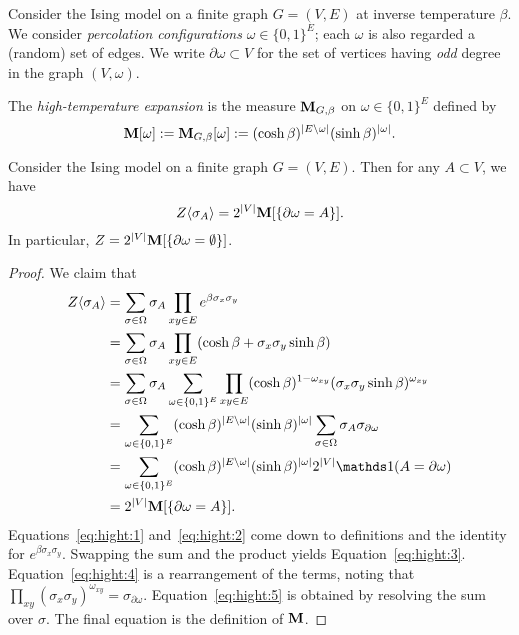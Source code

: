 \begin{definition}
    Consider the Ising model on a finite graph $G=(V,E)$ at inverse temperature $\beta$.
    We consider \emph{percolation configurations} $\omega\in\{0,1\}^E$;
    each $\omega$ is also regarded a (random) set of edges.
    We write $\partial\omega\subset V$ for the set of vertices having
    \emph{odd} degree in the graph $(V,\omega)$.

    The \emph{high-temperature expansion} is the measure $\mathbf{M}_{G,\beta}$
    on $\omega\in\{0,1\}^E$ defined by
    \[
        \mathbf{M}[\omega]:=\mathbf{M}_{G,\beta}[\omega]:=(\cosh\beta)^{|E\setminus\omega|}(\sinh\beta)^{|\omega|}.
    \]
\end{definition}

\begin{theorem}
    \label{thm:High-temperature expansion for correlation functions}
    Consider the Ising model on a finite graph $G=(V,E)$.
    Then for any $A\subset V$, we have
    \[
        Z\langle\sigma_A\rangle=2^{|V|}\mathbf{M}[\{\partial\omega=A\}].
    \]
    In particular, $Z=2^{|V|}\mathbf{M}[\{\partial\omega=\emptyset\}]$.
\end{theorem}

\begin{proof}
    We claim that
    \begin{align}
        \label{eq:hight:1}
        Z\langle\sigma_A\rangle
        &=
        \sum_{\sigma\in\Omega}
        \sigma_A
        \prod_{xy\in E}
        e^{\beta\sigma_x\sigma_y}
        \\
        \label{eq:hight:2}
        &=
        \sum_{\sigma\in\Omega}
        \sigma_A
        \prod_{xy\in E}
        (\cosh\beta+\sigma_x\sigma_y\sinh\beta)
        \\
        \label{eq:hight:3}
        &=
        \sum_{\sigma\in\Omega}
        \sigma_A
        \sum_{\omega\in\{0,1\}^E}
        \prod_{xy\in E}
        (\cosh\beta)^{1-\omega_{xy}}(\sigma_x\sigma_y\sinh\beta)^{\omega_{xy}}
        \\
        \label{eq:hight:4}
        &=
        \sum_{\omega\in\{0,1\}^E}
        (\cosh\beta)^{|E\setminus\omega|}(\sinh\beta)^{|\omega|}
        \sum_{\sigma\in\Omega}
        \sigma_A
        \sigma_{\partial\omega}
        \\
        \label{eq:hight:5}
        &=
        \sum_{\omega\in\{0,1\}^E}
        (\cosh\beta)^{|E\setminus\omega|}(\sinh\beta)^{|\omega|}
        2^{|V|}\true{A=\partial\omega}
        \\
        &=
        2^{|V|}\bfM[\{\partial\omega=A\}].
    \end{align}
    Equations~\eqref{eq:hight:1} and~\eqref{eq:hight:2}
    come down to definitions
    and the identity for $e^{\beta\sigma_x\sigma_y}$.
    Swapping the sum and the product yields Equation~\eqref{eq:hight:3}.
    Equation~\eqref{eq:hight:4} is a rearrangement of the terms,
    noting that $\prod_{xy}(\sigma_x\sigma_y)^{\omega_{xy}}=\sigma_{\partial\omega}$.
    Equation~\eqref{eq:hight:5} is obtained by resolving the sum over $\sigma$.
    The final equation is the definition of $\mathbf{M}$.
\end{proof}

